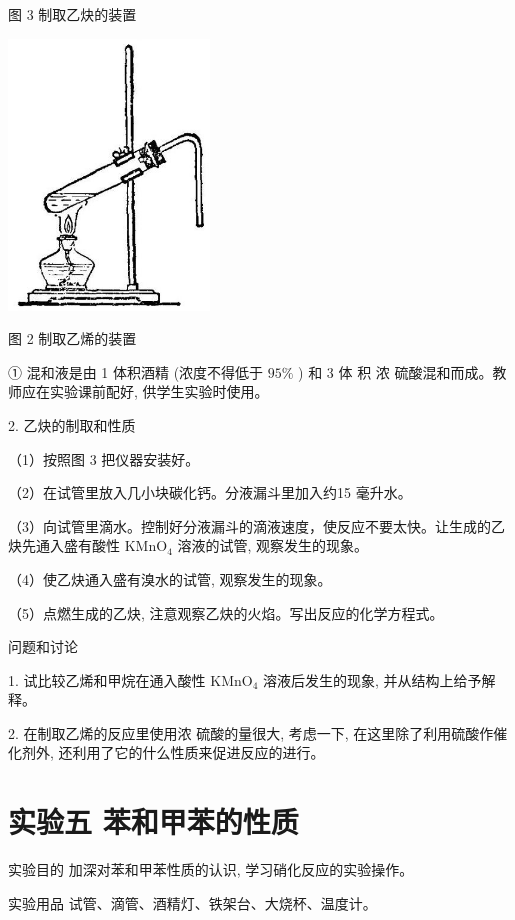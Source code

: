 \documentclass[10pt]{article}
\begin{document}
图 3 制取乙炔的装置

\begin{center}
\includegraphics[max width=0.4\textwidth]{images/01912d16-be99-77bb-9535-4f3ed8d9946f_213_192222.jpg}
\end{center}

图 2 制取乙烯的装置

① 混和液是由 1 体积酒精 (浓度不得低于 \({95}\%\) ) 和 3 体 积 浓 硫酸混和而成。教师应在实验课前配好, 供学生实验时使用。

2. 乙炔的制取和性质

（1）按照图 3 把仪器安装好。

（2）在试管里放入几小块碳化钙。分液漏斗里加入约15 毫升水。

（3）向试管里滴水。控制好分液漏斗的滴液速度，使反应不要太快。让生成的乙炔先通入盛有酸性 \({\mathrm{{KMnO}}}_{4}\) 溶液的试管, 观察发生的现象。

（4）使乙炔通入盛有溴水的试管, 观察发生的现象。

（5）点燃生成的乙炔, 注意观察乙炔的火焰。写出反应的化学方程式。

问题和讨论

1. 试比较乙烯和甲烷在通入酸性 \({\mathrm{{KMnO}}}_{4}\) 溶液后发生的现象, 并从结构上给予解释。

2. 在制取乙烯的反应里使用浓 硫酸的量很大, 考虑一下, 在这里除了利用硫酸作催化剂外, 还利用了它的什么性质来促进反应的进行。

\section*{实验五 苯和甲苯的性质}

实验目的 加深对苯和甲苯性质的认识, 学习硝化反应的实验操作。

实验用品 试管、滴管、酒精灯、铁架台、大烧杯、温度计。
\end{document}

